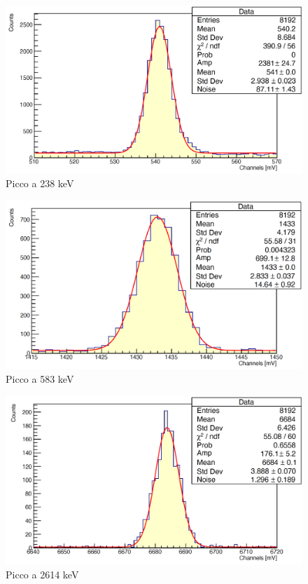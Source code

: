 \documentclass[a4paper,10pt]{article}
\begin{document}
\begin{figure}[H]
    \centering
    \includegraphics[scale=0.45]{appendice/spettri/ThCu1_22}
    \caption{Picco a 238 keV}
\end{figure}
\begin{figure}[H]
    \centering
    \includegraphics[scale=0.45]{appendice/spettri/ThCu2_22}
    \caption{Picco a 583 keV}
\end{figure}
\begin{figure}[H]
    \centering
    \includegraphics[scale=0.45]{appendice/spettri/ThCu3_22}
    \caption{Picco a 2614 keV}
\end{figure}
\end{document}
